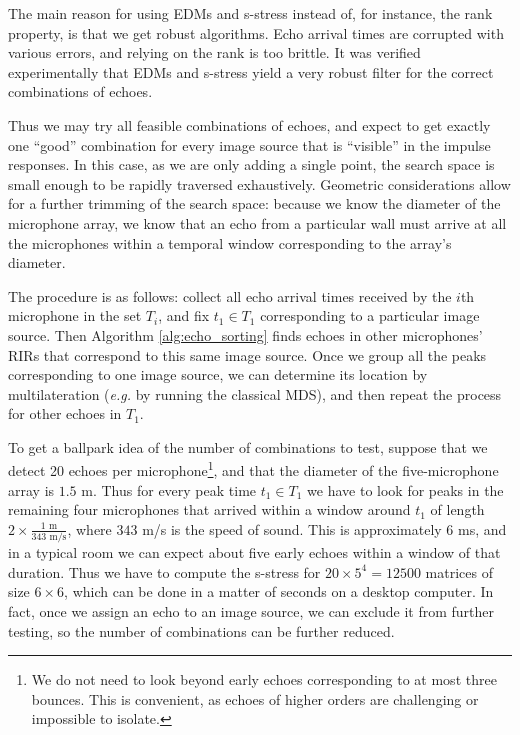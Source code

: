 \documentclass[10pt,double]{IEEEtran}
\newcommand{\rev}[1]{{#1}}
\begin{document}
The main reason for using EDMs and s-stress instead of, for instance, the rank
property, is that we get robust algorithms. Echo arrival times are corrupted
with various errors, and relying on the rank is too brittle. It was verified
experimentally \cite{Dokmanic:2013dz} that EDMs and s-stress yield a very
robust filter for the correct combinations of echoes.

Thus we may try all feasible combinations of echoes, and expect to get exactly
one ``good'' combination for every image source that is ``visible'' in the
impulse responses. In this case, as we are only adding a single point, the
search space is small enough to be rapidly traversed exhaustively. Geometric
considerations allow for a further trimming of the search space: \rev{because we
know the diameter of the microphone array, we know that an echo from a
particular wall must arrive at all the microphones within a temporal window
corresponding to the array's diameter.}

The procedure is as follows: collect all echo arrival times received by the
$i$th microphone in the set $T_i$, and fix $t_1 \in T_1$ corresponding to a
particular image source. Then Algorithm \ref{alg:echo_sorting} finds echoes in
other microphones' RIRs that correspond to this same image source. Once we
group all the peaks corresponding to one image source, we can determine its
location by multilateration (\emph{e.g.} by running the classical MDS), and
then repeat the process for other echoes in $T_1$.

\rev{To get a ballpark idea of the number of combinations to test, suppose that we
detect 20 echoes per microphone\footnote{\rev{We do not need to look beyond
early echoes corresponding to at most three bounces. This is convenient, as
echoes of higher orders are challenging or impossible to isolate.}}, and that the
diameter of the five-microphone array is $1.5$ m. Thus for every peak time
$t_1 \in T_1$ we have to look for peaks in the remaining four microphones that arrived
within a window around $t_1$ of length $2 \times
\frac{1 \text{~m}}{343 \text{~m/s}}$, where $343$ m/s is the
speed of sound. This is approximately $6$ ms, and in a typical room we can
expect about five early echoes within a window of that duration. Thus we have
to compute the s-stress for $20 \times 5^4 = 12500$ matrices of size $6 \times
6$, which can be done in a matter of seconds on a desktop computer. In fact,
once we assign an echo to an image source, we can exclude it from further
testing, so the number of combinations can be further reduced.}
\end{document}
